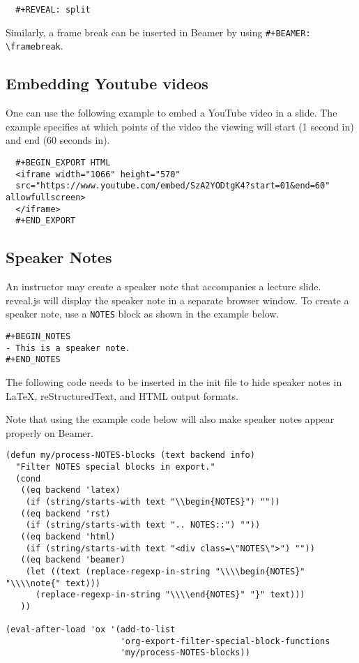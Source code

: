 \documentclass[10pt,article]{article}
\begin{document}
\begin{verbatim}
  #+REVEAL: split
\end{verbatim}

\begin{mdframed}
Similarly, a frame break can be inserted in Beamer by using \texttt{\#+BEAMER:
\textbackslash{}framebreak}.
\end{mdframed}

\subsection{Embedding Youtube videos}
\label{sec:orgbcc0f8e}
One can use the following example to embed a YouTube video in a slide. The
example specifies at which points of the video the viewing will start
(1 second in) and end (60 seconds in).
{\small
\begin{verbatim}
  #+BEGIN_EXPORT HTML
  <iframe width="1066" height="570"
  src="https://www.youtube.com/embed/SzA2YODtgK4?start=01&end=60" allowfullscreen>
  </iframe>
  #+END_EXPORT
\end{verbatim}
}
\subsection{Speaker Notes}
\label{sec:orgbf350ee}
An instructor may create a speaker note that accompanies a lecture
slide. reveal.js will display the speaker note in a separate browser
window. To create a speaker note, use a \texttt{NOTES} block as shown in the example
below.

\begin{verbatim}
#+BEGIN_NOTES
- This is a speaker note.
#+END_NOTES
\end{verbatim}

The following code needs to be inserted in the init file to hide speaker
notes in \LaTeX{}, reStructuredText, and HTML output formats.

\begin{mdframed}
Note that using the example code below will also make speaker notes appear
properly on Beamer.
\end{mdframed}

{\small
\begin{verbatim}
(defun my/process-NOTES-blocks (text backend info)
  "Filter NOTES special blocks in export."
  (cond
   ((eq backend 'latex)
    (if (string/starts-with text "\\begin{NOTES}") ""))
   ((eq backend 'rst)
    (if (string/starts-with text ".. NOTES::") ""))
   ((eq backend 'html)
    (if (string/starts-with text "<div class=\"NOTES\">") ""))
   ((eq backend 'beamer)
    (let ((text (replace-regexp-in-string "\\\\begin{NOTES}" "\\\\note{" text)))
      (replace-regexp-in-string "\\\\end{NOTES}" "}" text)))
   ))

(eval-after-load 'ox '(add-to-list
                       'org-export-filter-special-block-functions
                       'my/process-NOTES-blocks))
\end{verbatim}
}
\end{document}
